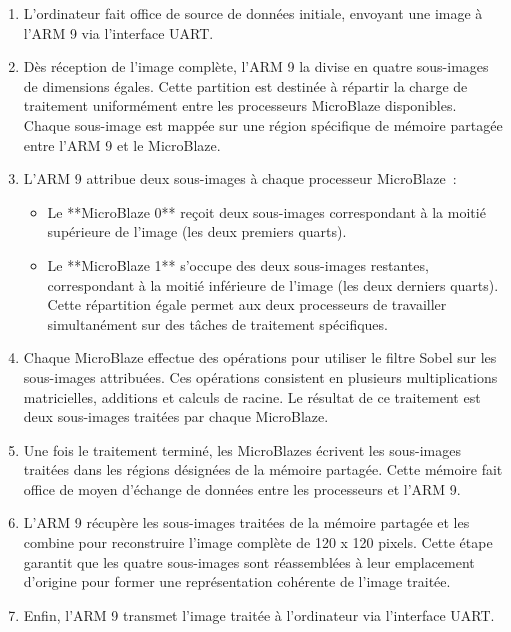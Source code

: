 \documentclass[../CSC_5RO07_TA.tex]{subfiles}
\begin{document}
\begin{enumerate}

\item L'ordinateur fait office de source de données initiale, envoyant une image à l'ARM 9 via l'interface UART.

\item Dès réception de l'image complète, l'ARM 9 la divise en quatre sous-images de dimensions égales. Cette partition est destinée à répartir la charge de traitement uniformément entre les processeurs MicroBlaze disponibles. Chaque sous-image est mappée sur une région spécifique de mémoire partagée entre l'ARM 9 et le MicroBlaze.

\item L'ARM 9 attribue deux sous-images à chaque processeur MicroBlaze :
\begin{itemize}
    \item Le **MicroBlaze 0** reçoit deux sous-images correspondant à la moitié supérieure de l'image (les deux premiers quarts).
    \item Le **MicroBlaze 1** s'occupe des deux sous-images restantes, correspondant à la moitié inférieure de l'image (les deux derniers quarts).
 Cette répartition égale permet aux deux processeurs de travailler simultanément sur des tâches de traitement spécifiques.
\end{itemize}

\item Chaque MicroBlaze effectue des opérations pour utiliser le filtre Sobel sur les sous-images attribuées. Ces opérations consistent en plusieurs multiplications matricielles, additions et calculs de racine. Le résultat de ce traitement est deux sous-images traitées par chaque MicroBlaze.

\item Une fois le traitement terminé, les MicroBlazes écrivent les sous-images traitées dans les régions désignées de la mémoire partagée. Cette mémoire fait office de moyen d'échange de données entre les processeurs et l'ARM 9.

\item L'ARM 9 récupère les sous-images traitées de la mémoire partagée et les combine pour reconstruire l'image complète de 120 x 120 pixels. Cette étape garantit que les quatre sous-images sont réassemblées à leur emplacement d'origine pour former une représentation cohérente de l'image traitée.

\item Enfin, l'ARM 9 transmet l'image traitée à l'ordinateur via l'interface UART.

\end{enumerate}
\end{document}
